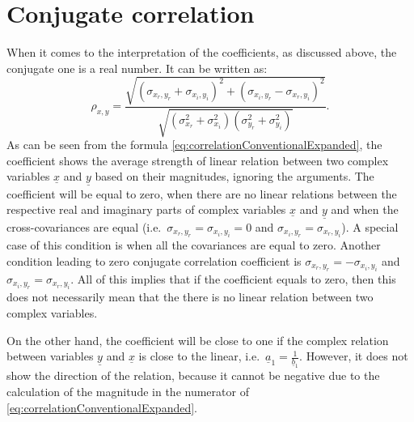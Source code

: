 \documentclass[
]{book}
\begin{document}
\hypertarget{correlationConjugate}{%
\section{Conjugate correlation}\label{correlationConjugate}}

When it comes to the interpretation of the coefficients, as discussed above, the conjugate one is a real number. It can be written as:
\begin{equation}
    {\rho}_{x,y} = \frac{\sqrt{(\sigma_{x_r, y_r} + \sigma_{x_i, y_i})^2 + (\sigma_{x_i, y_r} - \sigma_{x_r, y_i})^2}}{\sqrt{(\sigma_{x_r}^2 + \sigma_{x_i}^2)(\sigma_{y_r}^2 + \sigma_{y_i}^2)}} .
    \label{eq:correlationConventionalExpanded}
\end{equation}
As can be seen from the formula \eqref{eq:correlationConventionalExpanded}, the coefficient shows the average strength of linear relation between two complex variables \(\underline{x}\) and \(\underline{y}\) based on their magnitudes, ignoring the arguments. The coefficient will be equal to zero, when there are no linear relations between the respective real and imaginary parts of complex variables \(\underline{x}\) and \(\underline{y}\) and when the cross-covariances are equal (i.e.~\(\sigma_{x_r, y_r}=\sigma_{x_i, y_i}=0\) and \(\sigma_{x_i, y_r} = \sigma_{x_r, y_i}\)). A special case of this condition is when all the covariances are equal to zero. Another condition leading to zero conjugate correlation coefficient is \(\sigma_{x_r, y_r} = - \sigma_{x_i, y_i}\) and \(\sigma_{x_i, y_r} = \sigma_{x_r, y_i}\). All of this implies that if the coefficient equals to zero, then this does not necessarily mean that the there is no linear relation between two complex variables.

On the other hand, the coefficient will be close to one if the complex relation between variables \(\underline{y}\) and \(\underline{x}\) is close to the linear, i.e.~\(\underline{a}_1 = \frac{1}{\underline{b}_1}\). However, it does not show the direction of the relation, because it cannot be negative due to the calculation of the magnitude in the numerator of \eqref{eq:correlationConventionalExpanded}.
\end{document}
